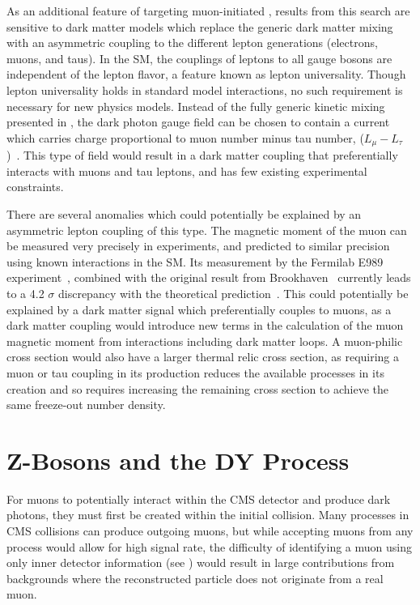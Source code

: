 As an additional feature of targeting muon-initiated \dbrem, results from this search are sensitive to dark matter models which replace the generic dark matter mixing with an asymmetric coupling to the different lepton generations (electrons, muons, and taus).
In the SM, the couplings of leptons to all gauge bosons are independent of the lepton flavor, a feature known as lepton universality.
Though lepton universality holds in standard model interactions, no such requirement is necessary for new physics models. 
Instead of the fully generic kinetic mixing presented in , the dark photon gauge field can be chosen to contain a current which carries charge proportional to muon number minus tau number, ($L_\mu - L_\tau$)~\cite{neut_trident}.
This type of field would result in a dark matter coupling that preferentially interacts with muons and tau leptons, and has few existing experimental constraints.

There are several anomalies which could potentially be explained by an asymmetric lepton coupling of this type.
The magnetic moment of the muon can be measured very precisely in experiments, and predicted to similar precision using known interactions in the SM.
Its measurement by the Fermilab E989 experiment~\cite{gminus2}, combined with the original result from Brookhaven~\cite{gminus2_bnl} currently leads to a 4.2 $\sigma$ discrepancy with the theoretical prediction~\cite{gminus2_theory}. 
This could potentially be explained by a dark matter signal which preferentially couples to muons, as a dark matter coupling would introduce new terms in the calculation of the muon magnetic moment from interactions including dark matter loops.
A muon-philic cross section would also have a larger thermal relic cross section, as requiring a muon or tau coupling in its production reduces the available processes in its creation and so requires increasing the remaining cross section to achieve the same freeze-out number density.

\section{Z-Bosons and the DY Process}
For muons to potentially interact within the CMS detector and produce dark photons, they must first be created within the initial collision.
Many processes in CMS collisions can produce outgoing muons, but while accepting muons from any process would allow for high signal rate, the difficulty of identifying a muon using only inner detector information (see ) would result in large contributions from backgrounds where the reconstructed particle does not originate from a real muon.

